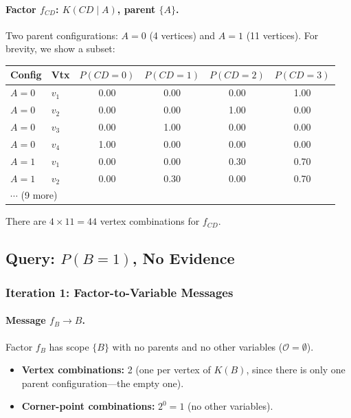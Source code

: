 \documentclass[11pt]{article}
\begin{document}
\paragraph{Factor $f_{CD}$: $K(CD \mid A)$, parent $\{A\}$.}
Two parent configurations: $A{=}0$ (4 vertices) and $A{=}1$ (11 vertices).
For brevity, we show a subset:
\begin{center}
\begin{tabular}{llcccc}
\toprule
\textbf{Config} & \textbf{Vtx} & $P(CD{=}0)$ & $P(CD{=}1)$ & $P(CD{=}2)$ & $P(CD{=}3)$ \\
\midrule
$A{=}0$ & $v_1$ & 0.00 & 0.00 & 0.00 & 1.00 \\
$A{=}0$ & $v_2$ & 0.00 & 0.00 & 1.00 & 0.00 \\
$A{=}0$ & $v_3$ & 0.00 & 1.00 & 0.00 & 0.00 \\
$A{=}0$ & $v_4$ & 1.00 & 0.00 & 0.00 & 0.00 \\
\midrule
$A{=}1$ & $v_1$ & 0.00 & 0.00 & 0.30 & 0.70 \\
$A{=}1$ & $v_2$ & 0.00 & 0.30 & 0.00 & 0.70 \\
\multicolumn{2}{l}{$\cdots$ (9 more)} \\
\bottomrule
\end{tabular}
\end{center}

There are $4 \times 11 = 44$ vertex combinations for $f_{CD}$.

\subsection{Query: $P(B{=}1)$, No Evidence}

\subsubsection{Iteration 1: Factor-to-Variable Messages}

\paragraph{Message $f_B \to B$.}
Factor $f_B$ has scope $\{B\}$ with no parents and no other variables ($\mathcal{O} = \emptyset$).

\begin{itemize}
\item \textbf{Vertex combinations:} 2 (one per vertex of $K(B)$, since there is only one parent configuration---the empty one).
\item \textbf{Corner-point combinations:} $2^0 = 1$ (no other variables).
\end{itemize}
\end{document}
